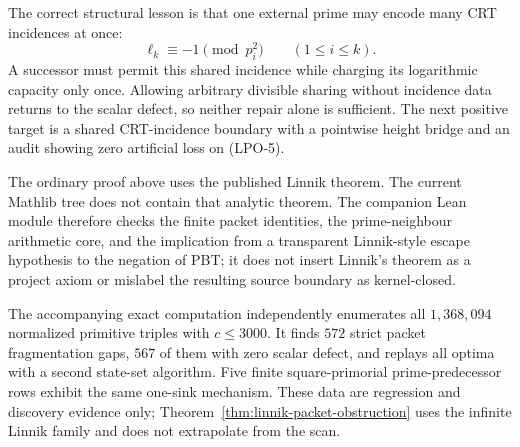 The correct structural lesson is that one external prime may encode many CRT
incidences at once:
\[
                         \ell_k\equiv-1\pmod{p_i^2}
                         \qquad(1\le i\le k).
\]
A successor must permit this shared incidence while charging its logarithmic
capacity only once.  Allowing arbitrary divisible sharing without incidence
data returns to the scalar defect, so neither repair alone is sufficient.
The next positive target is a shared CRT-incidence boundary with a pointwise
height bridge and an audit showing zero artificial loss on (LPO-5).

The ordinary proof above uses the published Linnik theorem.  The current
Mathlib tree does not contain that analytic theorem.  The companion Lean
module therefore checks the finite packet identities, the prime-neighbour
arithmetic core, and the implication from a transparent Linnik-style escape
hypothesis to the negation of PBT; it does not insert Linnik's theorem as a
project axiom or mislabel the resulting source boundary as kernel-closed.

The accompanying exact computation independently enumerates all
$1{,}368{,}094$ normalized primitive triples with $c\le3000$.  It finds $572$
strict packet fragmentation gaps, $567$ of them with zero scalar defect, and
replays all optima with a second state-set algorithm.  Five finite
square-primorial prime-predecessor rows exhibit the same one-sink mechanism.
These data are regression and discovery evidence only; Theorem~\ref{thm:linnik-packet-obstruction}
uses the infinite Linnik family and does not extrapolate from the scan.
